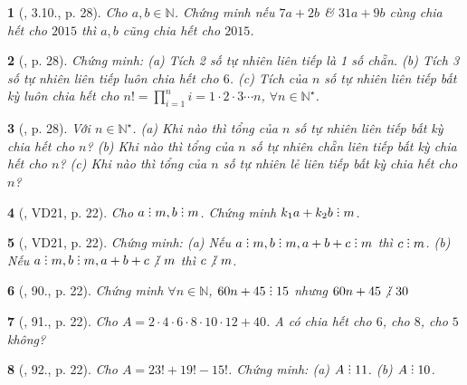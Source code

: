 \documentclass{article}
\newtheorem{baitoan}{}
\DeclareRobustCommand{\divby}{%
	\mathrel{\vbox{\baselineskip.65ex\lineskiplimit0pt\hbox{.}\hbox{.}\hbox{.}}}%
}
\begin{document}
\begin{baitoan}[\cite{Binh_boi_duong_Toan_6_tap_1}, 3.10., p. 28]
	Cho $a,b\in\mathbb{N}$. Chứng minh nếu $7a + 2b$ \& $31a + 9b$ cùng chia hết cho $2015$ thì $a,b$ cũng chia hết cho $2015$.
\end{baitoan}

\begin{baitoan}[\cite{Binh_boi_duong_Toan_6_tap_1}, p. 28]
	Chứng minh: (a) Tích 2 số tự nhiên liên tiếp là 1 số chẵn. (b) Tích 3 số tự nhiên liên tiếp luôn chia hết cho $6$. (c) Tích của $n$ số tự nhiên liên tiếp bất kỳ luôn chia hết cho $n! = \prod_{i=1}^n i = 1\cdot2\cdot3\cdots n$, $\forall n\in\mathbb{N}^\star$.
\end{baitoan}

\begin{baitoan}[\cite{Binh_boi_duong_Toan_6_tap_1}, p. 28]
	Với $n\in\mathbb{N}^\star$. (a) Khi nào thì tổng của $n$ số tự nhiên liên tiếp bất kỳ chia hết cho $n$? (b) Khi nào thì tổng của $n$ số tự nhiên chẵn liên tiếp bất kỳ chia hết cho $n$? (c) Khi nào thì tổng của $n$ số tự nhiên lẻ liên tiếp bất kỳ chia hết cho $n$?
\end{baitoan}

\begin{baitoan}[\cite{Tuyen_Toan_6}, VD21, p. 22]
	Cho $a\divby m,b\divby m$. Chứng minh $k_1a + k_2b\divby m$.
\end{baitoan}

\begin{baitoan}[\cite{Tuyen_Toan_6}, VD21, p. 22]
	Chứng minh: (a) Nếu $a\divby m,b\divby m,a + b + c\divby m$ thì $c\divby m$. (b) Nếu $a\divby m,b\divby m,a + b + c\not{\divby}\ m$ thì $c\not{\divby}\ m$.
\end{baitoan}

\begin{baitoan}[\cite{Tuyen_Toan_6}, 90., p. 22]
	Chứng minh $\forall n\in\mathbb{N}$, $60n + 45\divby15$ nhưng $60n + 45\not{\divby}\ 30$
\end{baitoan}

\begin{baitoan}[\cite{Tuyen_Toan_6}, 91., p. 22]
	Cho $A = 2\cdot4\cdot6\cdot8\cdot10\cdot12 + 40$. A có chia hết cho $6$, cho $8$, cho $5$ không?
\end{baitoan}

\begin{baitoan}[\cite{Tuyen_Toan_6}, 92., p. 22]
	Cho $A = 23! + 19! - 15!$. Chứng minh: (a) $A\divby11$. (b) $A\divby10$.
\end{baitoan}
\end{document}
